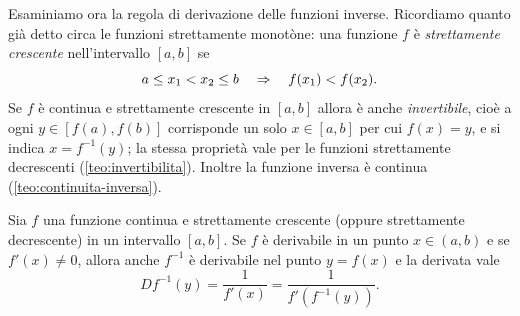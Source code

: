 Esaminiamo ora la regola di derivazione delle funzioni inverse. Ricordiamo quanto già
detto circa le funzioni strettamente monotòne: una funzione $f$ è \emph{strettamente
crescente} nell'intervallo $[a,b]$ se
\begin{equation}\label{eq:strettamente-crescente}
  a\le x_{1}<x_{2}\le b \quad\Rightarrow\quad f(x_{1})<f(x_{2}).
\end{equation}
Se $f$ è continua e strettamente crescente in $[a,b]$ allora è anche \emph{invertibile},
cioè a ogni $y\in[f(a),f(b)]$ corrisponde un solo $x\in[a,b]$ per cui $f(x)=y$, e si indica
$x=f^{-1}(y)$; la stessa proprietà vale per le funzioni strettamente decrescenti
(\cref{teo:invertibilita}). Inoltre la funzione inversa è continua
(\cref{teo:continuita-inversa}).

\begin{teorema}\label{teo:derivata-inversa}
Sia $f$ una funzione continua e strettamente crescente (oppure strettamente decrescente)
in un intervallo $[a,b]$. Se $f$ è derivabile in un punto $x\in(a,b)$ e se $f'(x)\neq0$,
allora anche $f^{-1}$ è derivabile nel punto $y=f(x)$ e la derivata vale
\begin{equation}\label{eq:derivata-inversa}
  D f^{-1}(y)=\frac1{f'(x)}=\frac1{f'(f^{-1}(y))}.
\end{equation}
\end{teorema}

\begin{schema}
\end{schema}

